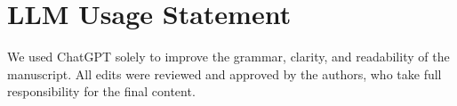 \section*{LLM Usage Statement}
We used ChatGPT solely to improve the grammar, clarity, and readability of the manuscript. All edits were reviewed and approved by the authors, who take full responsibility for the final content.
